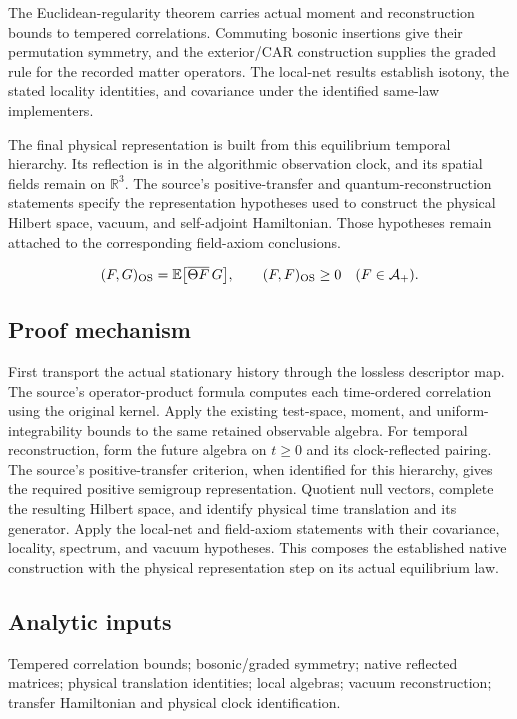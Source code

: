 \documentclass[11pt,a4paper]{article}
\begin{document}
The Euclidean-regularity theorem carries actual moment and reconstruction bounds to tempered correlations. Commuting bosonic insertions give their permutation symmetry, and the exterior/CAR construction supplies the graded rule for the recorded matter operators. The local-net results establish isotony, the stated locality identities, and covariance under the identified same-law implementers.

The final physical representation is built from this equilibrium temporal hierarchy. Its reflection is in the algorithmic observation clock, and its spatial fields remain on \(\mathbb R^3\). The source's positive-transfer and quantum-reconstruction statements specify the representation hypotheses used to construct the physical Hilbert space, vacuum, and self-adjoint Hamiltonian. Those hypotheses remain attached to the corresponding field-axiom conclusions.

\begin{gather*}
(F,G)_{\rm OS}=\mathbb E\bigl[\overline{\Theta F}\,G\bigr],\qquad
(F,F)_{\rm OS}\ge0\quad(F\in\mathcal A_+).
\end{gather*}
\subsection*{Proof mechanism}
First transport the actual stationary history through the lossless descriptor map. The source's operator-product formula computes each time-ordered correlation using the original kernel. Apply the existing test-space, moment, and uniform-integrability bounds to the same retained observable algebra. For temporal reconstruction, form the future algebra on \(t\ge0\) and its clock-reflected pairing. The source's positive-transfer criterion, when identified for this hierarchy, gives the required positive semigroup representation. Quotient null vectors, complete the resulting Hilbert space, and identify physical time translation and its generator. Apply the local-net and field-axiom statements with their covariance, locality, spectrum, and vacuum hypotheses. This composes the established native construction with the physical representation step on its actual equilibrium law.
\subsection*{Analytic inputs}
Tempered correlation bounds; bosonic/graded symmetry; native reflected matrices; physical translation identities; local algebras; vacuum reconstruction; transfer Hamiltonian and physical clock identification.
\end{document}
